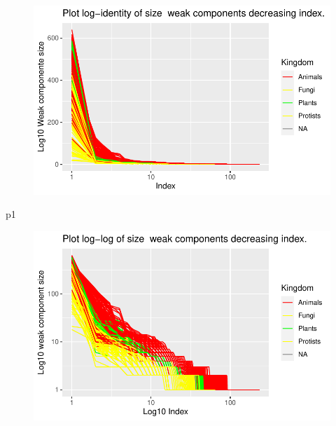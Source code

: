 \documentclass[
  letterpaper,
  DIV=11,
  numbers=noendperiod]{scrreprt}
\newenvironment{Shaded}{}{}
\newcommand{\NormalTok}[1]{\textcolor[rgb]{0.67,0.70,0.75}{#1}}
\begin{document}
\begin{figure}[H]

{\centering \includegraphics[width=1\textwidth,height=\textheight]{index_files/figure-pdf/unnamed-chunk-51-1.pdf}

}

\end{figure}

\begin{Shaded}
\begin{Highlighting}[]
\NormalTok{p1}
\end{Highlighting}
\end{Shaded}

\begin{figure}[H]

{\centering \includegraphics[width=1\textwidth,height=\textheight]{index_files/figure-pdf/unnamed-chunk-51-2.pdf}

}

\end{figure}
\end{document}
